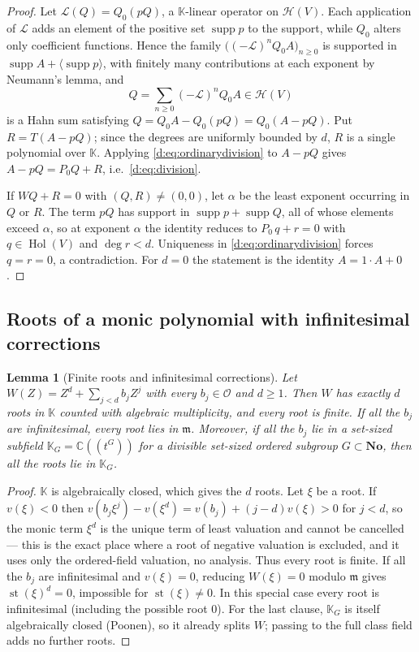 \documentclass[11pt,a4paper]{article}
\numberwithin{equation}{section}
\newtheorem{lemma}[theorem]{Lemma}
\theoremstyle{definition}
\theoremstyle{remark}
\theoremstyle{plain}
\newcommand{\K}{\mathbb K}
\newcommand{\No}{\mathbf{No}}
\newcommand{\CC}{\mathbb C}
\newcommand{\Ov}{\mathcal O}
\newcommand{\mm}{\mathfrak m}
\DeclareMathOperator{\Hol}{Hol}
\DeclareMathOperator{\supp}{supp}
\DeclareMathOperator{\st}{st}
\newcommand{\tm}{t}
\newcommand{\Hc}{\mathcal H}
\newcommand{\Neu}[1]{\langle #1\rangle}
\begin{document}
\begin{proof}
Let $\mathcal L(Q)=Q_0(pQ)$, a $\K$-linear operator on $\Hc(V)$.  Each
application of $\mathcal L$ adds an element of the positive set
$\supp p$ to the support, while $Q_0$ alters only coefficient
functions.  Hence the family $\bigl((-\mathcal L)^{n}Q_0A\bigr)_{n\ge0}$
is supported in $\supp A+\Neu{\supp p}$, with finitely many
contributions at each exponent by Neumann's lemma, and
\[
 Q=\sum_{n\ge0}(-\mathcal L)^{n}Q_0A\in\Hc(V)
\]
is a Hahn sum satisfying $Q=Q_0A-Q_0(pQ)=Q_0(A-pQ)$.  Put
$R=T(A-pQ)$; since the degrees are uniformly bounded by $d$, $R$ is a
single polynomial over $\K$.  Applying
\eqref{d:eq:ordinarydivision} to $A-pQ$ gives $A-pQ=P_0Q+R$, i.e.\
\eqref{d:eq:division}.

If $WQ+R=0$ with $(Q,R)\ne(0,0)$, let $\alpha$ be the least exponent
occurring in $Q$ or $R$.  The term $pQ$ has support in
$\supp p+\supp Q$, all of whose elements exceed $\alpha$, so at
exponent $\alpha$ the identity reduces to $P_0\,q+r=0$ with
$q\in\Hol(V)$ and $\deg r<d$.  Uniqueness in
\eqref{d:eq:ordinarydivision} forces $q=r=0$, a contradiction.  For
$d=0$ the statement is the identity $A=1\cdot A+0$.
\end{proof}

\subsection{Roots of a monic polynomial with infinitesimal corrections}
\label{d:sub:roots}

\begin{lemma}[Finite roots and infinitesimal corrections]
\label{d:lem:smallroots}
Let $W(Z)=Z^{d}+\sum_{j<d}b_jZ^{j}$ with every $b_j\in\Ov$ and $d\ge1$.
Then $W$ has exactly $d$ roots in $\K$ counted with algebraic
multiplicity, and every root is finite. If all the $b_j$ are
infinitesimal, every root lies in $\mm$.  Moreover, if all the $b_j$
lie in a set-sized subfield $\K_G=\CC((\tm^{G}))$ for a divisible
set-sized ordered subgroup $G\subset\No$, then all the roots lie in
$\K_G$.
\end{lemma}

\begin{proof}
$\K$ is algebraically closed, which gives the $d$ roots.  Let $\xi$ be
a root.  If $v(\xi)<0$ then
$v(b_j\xi^{j})-v(\xi^{d})=v(b_j)+(j-d)v(\xi)>0$ for $j<d$, so the monic
term $\xi^{d}$ is the unique term of least valuation and cannot be
cancelled --- this is the exact place where a root of negative
valuation is excluded, and it uses only the ordered-field valuation, no
analysis. Thus every root is finite. If all the $b_j$ are
infinitesimal and $v(\xi)=0$, reducing $W(\xi)=0$ modulo $\mm$ gives
$\st(\xi)^d=0$, impossible for $\st(\xi)\ne0$. In this special case
every root is infinitesimal (including the possible root $0$).  For the last clause, $\K_G$ is itself
algebraically closed (Poonen), so it already splits $W$; passing to the
full class field adds no further roots.
\end{proof}
\end{document}
